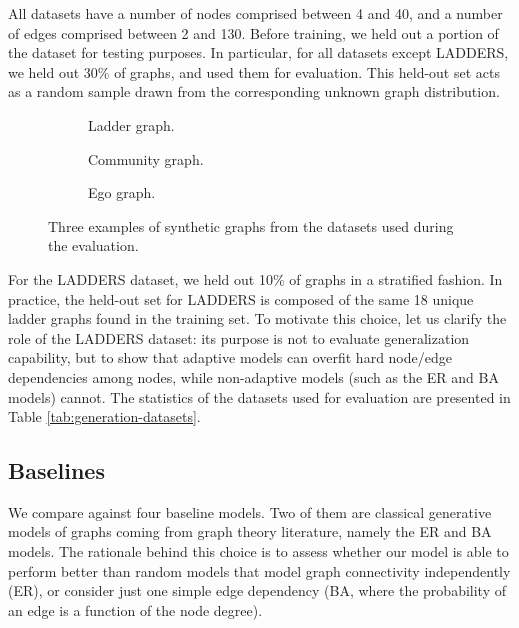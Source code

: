 All datasets have a number of nodes comprised between 4 and 40, and a number of edges comprised between 2 and 130. Before training, we held out a portion of the dataset for testing purposes. In particular, for all datasets except LADDERS, we held out 30\% of graphs, and used them for evaluation. This held-out set acts as a random sample drawn from the corresponding unknown graph distribution.
\begin{figure}[h!]
    \begin{subfigure}[b]{0.25\linewidth}
        \centering
        \resizebox{.55\textwidth}{!}{}
        \caption{Ladder graph.}
        \label{fig:ladder}
    \end{subfigure}
    \begin{subfigure}[b]{0.43\linewidth}
        \centering
        \resizebox{.8\textwidth}{!}{}
        \caption{Community graph.}
        \label{fig:community}
    \end{subfigure}
    \begin{subfigure}[b]{0.30\linewidth}
        \centering
        \resizebox{.8\textwidth}{!}{}
        \caption{Ego graph.}
        \label{fig:ego}
    \end{subfigure}
    \caption{Three examples of synthetic graphs from the datasets used during the evaluation.}
    \label{fig:synthetic-graphs}
\end{figure}
For the LADDERS dataset, we held out 10\% of graphs in a stratified fashion. In practice, the held-out set for LADDERS is composed of the same 18 unique ladder graphs found in the training set. To motivate this choice, let us clarify the role of the LADDERS dataset: its purpose is not to evaluate generalization capability, but to show that adaptive models can overfit hard node/edge dependencies among nodes, while non-adaptive models (such as the ER and BA models) cannot. The statistics of the datasets used for evaluation are presented in Table \ref{tab:generation-datasets}.



\subsection{Baselines}
We compare against four baseline models. Two of them are classical generative models of graphs coming from graph theory literature, namely the ER and BA models. The rationale behind this choice is to assess whether our model is able to perform better than random models that model graph connectivity independently (ER), or consider just one simple edge dependency (BA, where the probability of an edge is a function of the node degree).

